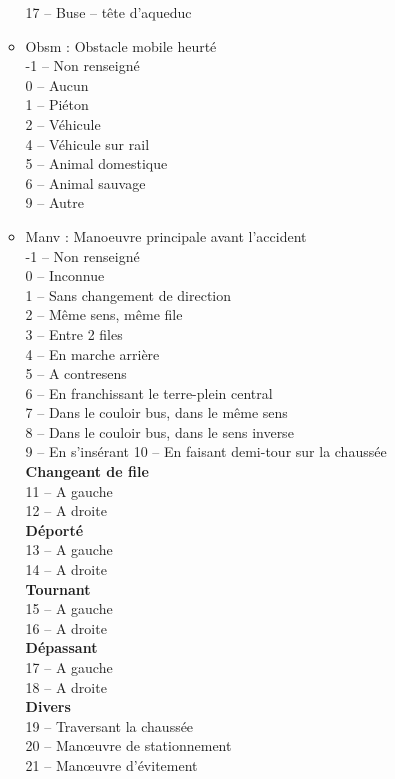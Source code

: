\documentclass[french,]{tp}
\begin{document}
\begin{itemize}
\begin{itemize}
    17 -- Buse -- tête d'aqueduc
  \item
    Obsm : Obstacle mobile heurté\\
    -1 -- Non renseigné\\
    0 -- Aucun\\
    1 -- Piéton\\
    2 -- Véhicule\\
    4 -- Véhicule sur rail\\
    5 -- Animal domestique\\
    6 -- Animal sauvage\\
    9 -- Autre
  \item
    Manv : Manoeuvre principale avant l'accident\\
    -1 -- Non renseigné\\
    0 -- Inconnue\\
    1 -- Sans changement de direction\\
    2 -- Même sens, même file\\
    3 -- Entre 2 files\\
    4 -- En marche arrière\\
    5 -- A contresens\\
    6 -- En franchissant le terre-plein central\\
    7 -- Dans le couloir bus, dans le même sens\\
    8 -- Dans le couloir bus, dans le sens inverse\\
    9 -- En s'insérant
    10 -- En faisant demi-tour sur la chaussée\\
    \textbf{Changeant de file}\\
    11 -- A gauche\\
    12 -- A droite\\
    \textbf{Déporté}\\
    13 -- A gauche\\
    14 -- A droite\\
    \textbf{Tournant}\\
    15 -- A gauche\\
    16 -- A droite\\
    \textbf{Dépassant}\\
    17 -- A gauche\\
    18 -- A droite\\
    \textbf{Divers}\\
    19 -- Traversant la chaussée\\
    20 -- Manœuvre de stationnement\\
    21 -- Manœuvre d'évitement\\

\end{itemize}
\end{itemize}
\end{document}

